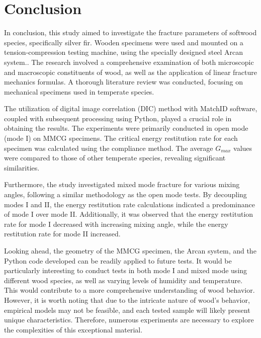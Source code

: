 
\chapter{Conclusion} %

\label{Conclusion} %


In conclusion, this study aimed to investigate the fracture parameters of softwood species, specifically silver fir. Wooden specimens were used and mounted on a tension-compression testing machine, using the specially designed steel Arcan system.. The research involved a comprehensive examination of both microscopic and macroscopic constituents of wood, as well as the application of linear fracture mechanics formulas. A thorough literature review was conducted, focusing on mechanical specimens used in temperate species.

The utilization of digital image correlation (DIC) method with MatchID software, coupled with subsequent processing using Python, played a crucial role in obtaining the results. The experiments were primarily conducted in open mode (mode I) on MMCG specimens. The critical energy restitution rate for each specimen was calculated using the compliance method. The average $G_{max}$ values were compared to those of other temperate species, revealing significant similarities.

Furthermore, the study investigated mixed mode fracture for various mixing angles, following a similar methodology as the open mode tests. By decoupling modes I and II, the energy restitution rate calculations indicated a predominance of mode I over mode II. Additionally, it was observed that the energy restitution rate for mode I decreased with increasing mixing angle, while the energy restitution rate for mode II increased.

Looking ahead, the geometry of the MMCG specimen, the Arcan system, and the Python code developed can be readily applied to future tests. It would be particularly interesting to conduct tests in both mode I and mixed mode using different wood species, as well as varying levels of humidity and temperature. This would contribute to a more comprehensive understanding of wood behavior. However, it is worth noting that due to the intricate nature of wood's behavior, empirical models may not be feasible, and each tested sample will likely present unique characteristics. Therefore, numerous experiments are necessary to explore the complexities of this exceptional material.